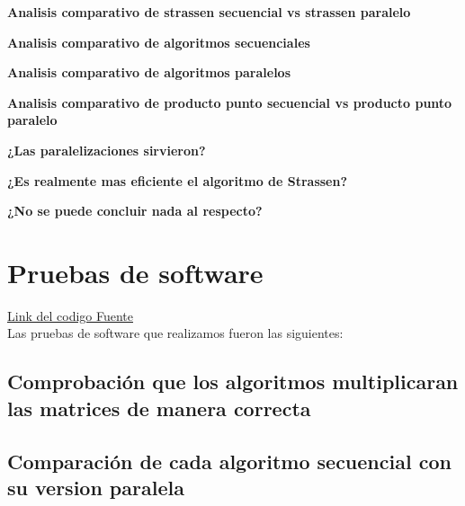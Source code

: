 \documentclass[conference]{IEEEtran}
\begin{document}
\textbf{Analisis comparativo de strassen secuencial vs strassen paralelo}



\textbf{Analisis comparativo de algoritmos secuenciales}



\textbf{Analisis comparativo de algoritmos paralelos}



\textbf{Analisis comparativo de producto punto secuencial vs producto punto paralelo}




\textbf{¿Las paralelizaciones sirvieron?}



\textbf{¿Es realmente mas eficiente el algoritmo de Strassen? }


\textbf{¿No se puede concluir nada al respecto?} 


\section{\textbf{Pruebas de software}}

\href{https://github.com/JAMM0118/taller4-pfc-2023-2/tree/Alejandro}
{Link del codigo Fuente} \\

Las pruebas de software que realizamos fueron las siguientes:

\subsection{Comprobación que los algoritmos multiplicaran las matrices de manera correcta}
\subsection{Comparación de cada algoritmo secuencial con su version paralela}
\end{document}
